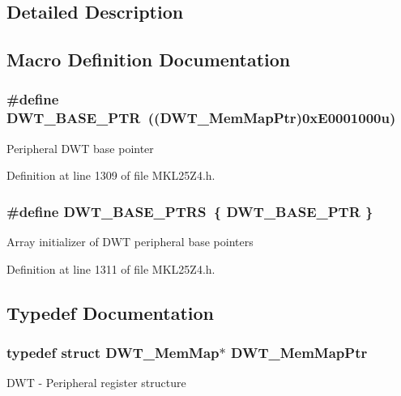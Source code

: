 \subsection{Detailed Description}


\subsection{Macro Definition Documentation}
\subsubsection[{\texorpdfstring{D\+W\+T\+\_\+\+B\+A\+S\+E\+\_\+\+P\+TR}{DWT_BASE_PTR}}]{\setlength{\rightskip}{0pt plus 5cm}\#define D\+W\+T\+\_\+\+B\+A\+S\+E\+\_\+\+P\+TR~(({\bf D\+W\+T\+\_\+\+Mem\+Map\+Ptr})0x\+E0001000u)}\hypertarget{group___d_w_t___peripheral_ga3b46dfb2ea7946c6938028d879c82cb1}{}\label{group___d_w_t___peripheral_ga3b46dfb2ea7946c6938028d879c82cb1}
Peripheral D\+WT base pointer 

Definition at line 1309 of file M\+K\+L25\+Z4.\+h.

\subsubsection[{\texorpdfstring{D\+W\+T\+\_\+\+B\+A\+S\+E\+\_\+\+P\+T\+RS}{DWT_BASE_PTRS}}]{\setlength{\rightskip}{0pt plus 5cm}\#define D\+W\+T\+\_\+\+B\+A\+S\+E\+\_\+\+P\+T\+RS~\{ {\bf D\+W\+T\+\_\+\+B\+A\+S\+E\+\_\+\+P\+TR} \}}\hypertarget{group___d_w_t___peripheral_ga606d55285f2df3c4bb43272ec842b475}{}\label{group___d_w_t___peripheral_ga606d55285f2df3c4bb43272ec842b475}
Array initializer of D\+WT peripheral base pointers 

Definition at line 1311 of file M\+K\+L25\+Z4.\+h.



\subsection{Typedef Documentation}
\subsubsection[{\texorpdfstring{D\+W\+T\+\_\+\+Mem\+Map\+Ptr}{DWT_MemMapPtr}}]{\setlength{\rightskip}{0pt plus 5cm}typedef struct {\bf D\+W\+T\+\_\+\+Mem\+Map}$\ast$ {\bf D\+W\+T\+\_\+\+Mem\+Map\+Ptr}}\hypertarget{group___d_w_t___peripheral_ga8a09a1b28d871c18ae8c69f67af6d573}{}\label{group___d_w_t___peripheral_ga8a09a1b28d871c18ae8c69f67af6d573}
D\+WT -\/ Peripheral register structure 